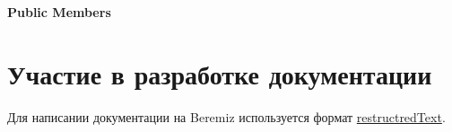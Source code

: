 \documentclass[letterpaper,10pt,russian]{sphinxmanual}
\begin{document}
\begin{fulllineitems}
\label{developer_guide/soft_plc/debugger:_CPPv211dbgvardsc_t}~\paragraph{Public Members}

\begin{fulllineitems}
\label{developer_guide/soft_plc/debugger:_CPPv2N11dbgvardsc_t3ptrE}
\end{fulllineitems}


\begin{fulllineitems}
\label{developer_guide/soft_plc/debugger:_CPPv2N11dbgvardsc_t4typeE}
\end{fulllineitems}


\end{fulllineitems}



\section{Участие в разработке документации}
\label{documentation_guide/index::doc}\label{documentation_guide/index:id1}
Для написании документации на Beremiz используется формат \href{http://docutils.sourceforge.net/docs/ref/rst/restructuredtext.html}{restructredText}.
\end{document}
